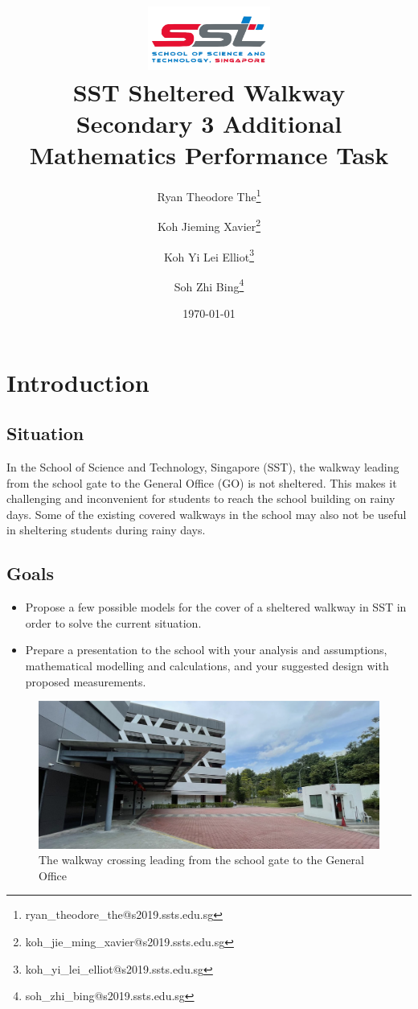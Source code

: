 \documentclass[a4paper,titlepage]{article}
\title{
\includegraphics[width=4cm]{sst.png}\\
\vspace{1cm}
\textbf{SST Sheltered Walkway}\\
{\large Secondary 3 Additional Mathematics Performance Task}
}
\author{Ryan Theodore The\thanks{ryan\_theodore\_the@s2019.ssts.edu.sg}}
\author{Koh Jieming Xavier\thanks{koh\_jie\_ming\_xavier@s2019.ssts.edu.sg}}
\author{Koh Yi Lei Elliot\thanks{koh\_yi\_lei\_elliot@s2019.ssts.edu.sg}}
\author{Soh Zhi Bing\thanks{soh\_zhi\_bing@s2019.ssts.edu.sg}}
\affil{School of Science and Technology, Singapore}
\date{\today}
\begin{document}
\maketitle

{\setlength{\parskip}{0pt}\tableofcontents}

\pagebreak
\section{Introduction}\label{sec:Introduction}

\subsection{Situation}\label{sec:Introduction:Problem}

In the School of Science and Technology, Singapore (SST), the walkway leading from the school gate to the General Office (GO) is not sheltered. This makes it challenging and inconvenient for students to reach the school building on rainy days. Some of the existing covered walkways in the school may also not be useful in sheltering students during rainy days. 

\subsection{Goals}\label{sec:Introduction:Goals}

\begin{itemize}
    \item Propose a few possible models for the cover of a sheltered walkway in SST in order to solve the current situation.
    \item Prepare a presentation to the school with your analysis and assumptions, mathematical modelling and calculations, and your suggested design with proposed measurements.
\end{itemize}

\begin{figure}[htbp]
    \centering
    \includegraphics[width=\textwidth]{currentShelter.png}
    \caption{The walkway crossing leading from the school gate to the General Office}
    \label{fig:currentShelter}
\end{figure}
\end{document}
